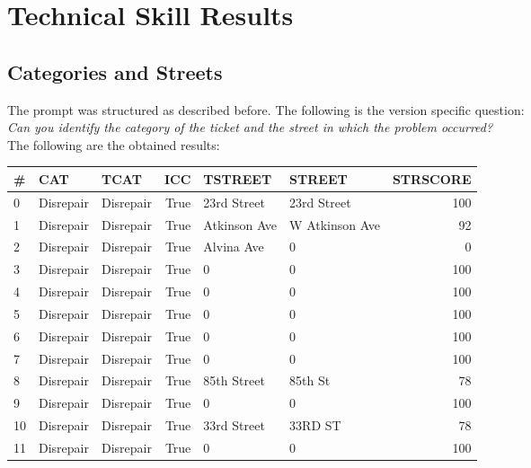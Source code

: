 \section{Technical Skill Results}

\subsection{Categories and Streets}
The prompt was structured as described before. The following is the version specific question:\\

\textit{Can you identify the category of the ticket and the street in which the problem occurred?}\\

The following are the obtained results:
\begin{center}
      \begin{tabular}{lllrllr}
            \toprule
            \# & CAT       & TCAT      & ICC  & TSTREET       & STREET         & STRSCORE \\
            \midrule
            0  & Disrepair & Disrepair & True & 23rd Street   & 23rd Street    & 100      \\
            1  & Disrepair & Disrepair & True & Atkinson Ave  & W Atkinson Ave & 92       \\
            2  & Disrepair & Disrepair & True & Alvina Ave    & 0              & 0        \\
            3  & Disrepair & Disrepair & True & 0             & 0              & 100      \\
            4  & Disrepair & Disrepair & True & 0             & 0              & 100      \\
            5  & Disrepair & Disrepair & True & 0             & 0              & 100      \\
            6  & Disrepair & Disrepair & True & 0             & 0              & 100      \\
            7  & Disrepair & Disrepair & True & 0             & 0              & 100      \\
            8  & Disrepair & Disrepair & True & 85th Street   & 85th St        & 78       \\
            9  & Disrepair & Disrepair & True & 0             & 0              & 100      \\
            10 & Disrepair & Disrepair & True & 33rd Street   & 33RD ST        & 78       \\
            11 & Disrepair & Disrepair & True & 0             & 0              & 100      \\

\end{tabular}
\end{center}
